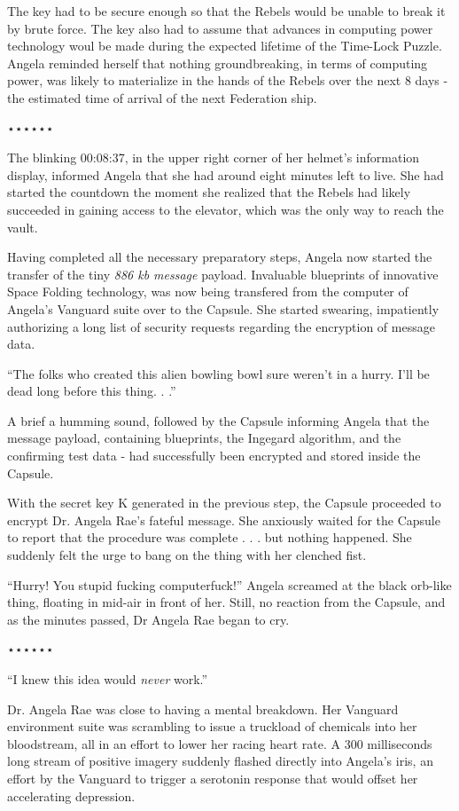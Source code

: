 \documentclass[smalldemyvopaper,11pt,twoside,onecolumn,openright,extrafontsizes]{memoir}
\begin{document}
 
 The key had to be secure enough so that the Rebels would be unable to break it by brute force. The key also had to assume that advances in computing power technology woul be made during the expected lifetime of the Time-Lock Puzzle. Angela reminded herself that nothing groundbreaking, in terms of computing power, was likely to materialize in the hands of the Rebels over the next 8 days - the estimated time of arrival of the next Federation ship.

⋆⋆⋆⋆⋆⋆

The blinking 00:08:37, in the upper right corner of her helmet’s information display, informed Angela that she had around eight minutes left to live. She had started the countdown the moment she realized that the Rebels had likely succeeded in gaining access to the elevator, which was the only way to reach the vault.

 
Having completed all the necessary preparatory steps, Angela now started the transfer of the tiny \textit{886 kb message} payload. Invaluable blueprints of innovative Space Folding technology, was now being transfered from the computer of Angela’s Vanguard suite over to the Capsule. She started swearing, impatiently authorizing a long list of security requests regarding the encryption of message data.

 
  “The folks who created this alien bowling bowl sure weren’t in a hurry. I’ll be dead long before this thing. . .”

 
  A brief a humming sound, followed by the Capsule informing Angela that the message payload, containing blueprints, the Ingegard algorithm, and the confirming test data - had successfully been encrypted and stored inside the Capsule.

 
  With the secret key K generated in the previous step, the Capsule proceeded to encrypt Dr. Angela Rae’s fateful message. She anxiously waited for the Capsule to report that the procedure was complete . . . but nothing happened. She suddenly felt the urge to bang on the thing with her clenched fist.

 
  “Hurry! You stupid fucking computerfuck!” Angela screamed at the black orb-like thing, floating in mid-air in front of her. Still, no reaction from the Capsule, and as the minutes passed, Dr Angela Rae began to cry.

⋆⋆⋆⋆⋆⋆

“I knew this idea would \textit{never} work.”

Dr. Angela Rae was close to having a mental breakdown. Her Vanguard environment suite was scrambling to issue a truckload of chemicals into her bloodstream, all in an effort to lower her racing heart rate. A 300 milliseconds long stream of positive imagery suddenly flashed directly into Angela’s iris, an effort by the Vanguard to trigger a serotonin response that would offset her accelerating depression.
\end{document}
